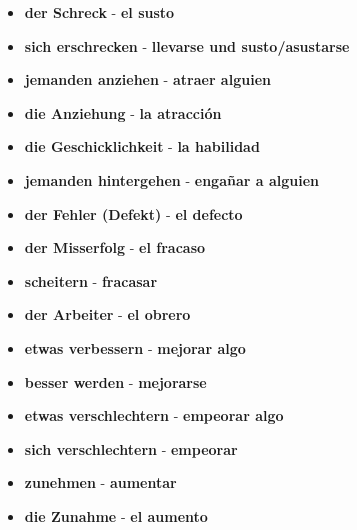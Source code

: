 \documentclass{article}
\begin{document}
\begin{multicols}{2}
\begin{itemize}
		\item{\textbf{der Schreck} - \textbf{el susto}}
		\item{\textbf{sich erschrecken} - \textbf{llevarse und susto/asustarse}}
		\item{\textbf{jemanden anziehen} - \textbf{atraer alguien}}
		\item{\textbf{die Anziehung} - \textbf{la atracción}}
		\item{\textbf{die Geschicklichkeit} - \textbf{la habilidad}}
		\item{\textbf{jemanden hintergehen} - \textbf{engañar a alguien}}
		\item{\textbf{der Fehler (Defekt)} - \textbf{el defecto}}
		\item{\textbf{der Misserfolg} - \textbf{el fracaso}}
		\item{\textbf{scheitern} - \textbf{fracasar}}
		\item{\textbf{der Arbeiter} - \textbf{el obrero}}
		\item{\textbf{etwas verbessern} - \textbf{mejorar algo}}
		\item{\textbf{besser werden} - \textbf{mejorarse}}
		\item{\textbf{etwas verschlechtern} - \textbf{empeorar algo}}
		\item{\textbf{sich verschlechtern} - \textbf{empeorar}}
		\item{\textbf{zunehmen} - \textbf{aumentar}}
		\item{\textbf{die Zunahme} - \textbf{el aumento}}
	\end{itemize}
	
		\end{multicols}
	
\end{document}
